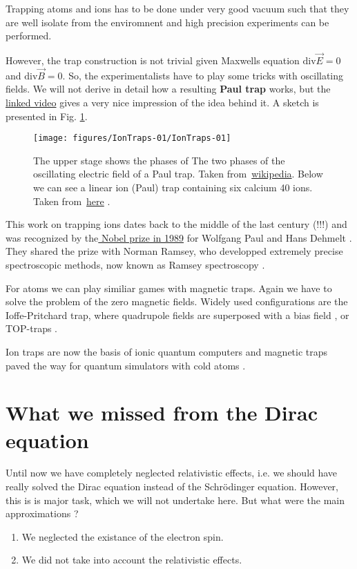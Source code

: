 \documentclass[10pt]{article}
\let\cite\citep
\providecommand\citep{\cite}
\begin{document}
Trapping atoms and ions has to be done under very good vacuum such that they are well isolate from the enviromnent and high precision experiments can be performed. 

However, the trap construction is not trivial given Maxwells equation $\text{div} \vec{E} = 0$ and $\text{div} \vec{B} = 0$. So, the experimentalists have to play some tricks with oscillating fields. We will not derive in detail how a resulting \textbf{Paul trap} works, but the  \href{https://youtu.be/Xb-zpM0UOzk}{linked video} gives a very nice impression of the idea behind it. A sketch is presented in Fig. \ref{149591}.
\begin{figure}[h!]
\begin{center}
\texttt{[image: figures/IonTraps-01/IonTraps-01]}
\caption{{The upper stage shows the phases of The two phases of the oscillating
electric field of a Paul trap. Taken
from~\href{https://en.wikipedia.org/wiki/Quadrupole_ion_trap}{wikipedia}.
Below we can see a linear ion (Paul) trap containing six calcium 40
ions. Taken
from~\href{https://quantumoptics.at/en/research/lintrap.html}{here} .
{\label{149591}}%
}}
\end{center}
\end{figure}


This work on trapping ions dates back to the middle of the last century (!!!) and was recognized by the\href{https://www.nobelprize.org/prizes/physics/1989/summary/}{ Nobel prize in 1989} for Wolfgang Paul \cite{Paul_1990} and Hans Dehmelt \cite{Dehmelt_1990}. They shared the prize with Norman Ramsey, who developped extremely precise spectroscopic methods, now known as Ramsey spectroscopy \cite{Ramsey_1990}. 

For atoms we can play similiar games with magnetic traps. Again we have to solve the problem of the zero magnetic fields. Widely used configurations are the Ioffe-Pritchard trap, where quadrupole fields are superposed with a bias field \cite{Pritchard_1983}, or TOP-traps \cite{Petrich_1995}.

Ion traps are now the basis of ionic quantum computers \cite{ions}  and magnetic traps paved the way for quantum simulators with cold atoms \cite{Jendrzejewskia}. 



\section{What we missed from the Dirac equation}
Until now we have completely neglected relativistic effects, i.e. we should have really solved the Dirac equation instead of the Schrödinger equation. However, this is is major task, which we will not undertake here. But what were the main approximations ?
\begin{enumerate}
\item We neglected the existance of the electron spin.
\item We did not take into account the relativistic effects.
\end{enumerate}
\end{document}
